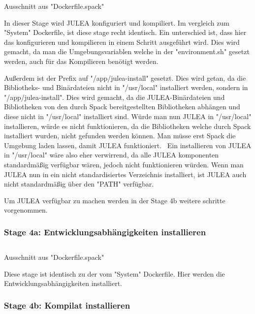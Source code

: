 \begin{listing}[H]
    \inputminted[firstline=32,lastline=40]{dockerfile}{./code-examples/Dockerfile.spack}
    \caption{Ausschnitt aus "Dockerfile.spack"}
\end{listing}

In dieser Stage wird JULEA konfiguriert und kompiliert. Im vergleich zum "System" Dockerfile, ist diese stage recht identisch. Ein unterschied ist, dass hier das konfigurieren und kompilieren in einem Schritt ausgeführt wird. Dies wird gemacht, da man die Umgebungsvariablen welche in der "environment.sh" gesetzt werden, auch für das Kompilieren benötigt werden. 

Außerdem ist der Prefix auf "/app/julea-install" gesetzt. Dies wird getan, da die Bibliotheks- und Binärdateien nicht in "/usr/local" installiert werden, sondern in "/app/julea-install". Dies wird gemacht, da die JULEA-Binärdateien und Bibliotheken von den durch Spack bereitgestellten Bibliotheken abhängen und diese nicht in "/usr/local" installiert sind. Würde man nun JULEA in "/usr/local" installieren, würde es nicht funktionieren, da die Bibliotheken welche durch Spack installiert wurden, nicht gefunden werden können. Man müsse erst Spack die Umgebung laden lassen, damit JULEA funktioniert. \
Ein installieren von JULEA in "/usr/local" wäre also eher verwirrend, da alle JULEA komponenten standardmäßig verfügbar wären, jedoch nicht funktionieren würden. Wenn man JULEA nun in ein nicht standardisiertes Verzeichnis installiert, ist JULEA auch nicht standardmäßig über den "PATH" verfügbar. 

Um JULEA verfügbar zu machen werden in der Stage 4b weitere schritte vorgenommen.

\subsubsection{Stage 4a: Entwicklungsabhängigkeiten installieren}


\begin{listing}[H]
\inputminted[firstline=51,lastline=55]{dockerfile}{./code-examples/Dockerfile.spack}
\caption{Ausschnitt aus "Dockerfile.spack"}
\end{listing}


Diese stage ist identisch zu der vom "System" Dockerfile. Hier werden die Entwicklungsabhängigkeiten installiert.


\subsubsection{Stage 4b: Kompilat installieren}

